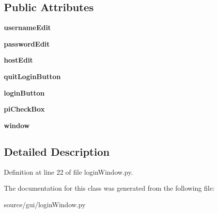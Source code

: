 \subsection*{Public Attributes}
\begin{DoxyCompactItemize}
\item 
\mbox{\label{classlogin_window_1_1_login_window_a6608b4ef07b942f60cafef54c5a49235}} 
{\bfseries username\+Edit}
\item 
\mbox{\label{classlogin_window_1_1_login_window_a1bcdac33c5fd39d7de702edf0afb3b1b}} 
{\bfseries password\+Edit}
\item 
\mbox{\label{classlogin_window_1_1_login_window_a4789c4287a56c9aae13199f12cfcf16e}} 
{\bfseries host\+Edit}
\item 
\mbox{\label{classlogin_window_1_1_login_window_ad70248c9f9b92393d49cb08cedc3d2f4}} 
{\bfseries quit\+Login\+Button}
\item 
\mbox{\label{classlogin_window_1_1_login_window_aaff46d928af9388c4bf86efbb00f35f1}} 
{\bfseries login\+Button}
\item 
\mbox{\label{classlogin_window_1_1_login_window_afada451348e7907e5fc4e7b514c6c162}} 
{\bfseries pi\+Check\+Box}
\item 
\mbox{\label{classlogin_window_1_1_login_window_affe2d3ae00ba76fa8b5ab4e8fc78e91b}} 
{\bfseries window}
\end{DoxyCompactItemize}


\subsection{Detailed Description}


Definition at line 22 of file login\+Window.\+py.



The documentation for this class was generated from the following file\+:\begin{DoxyCompactItemize}
\item 
source/gui/login\+Window.\+py\end{DoxyCompactItemize}
